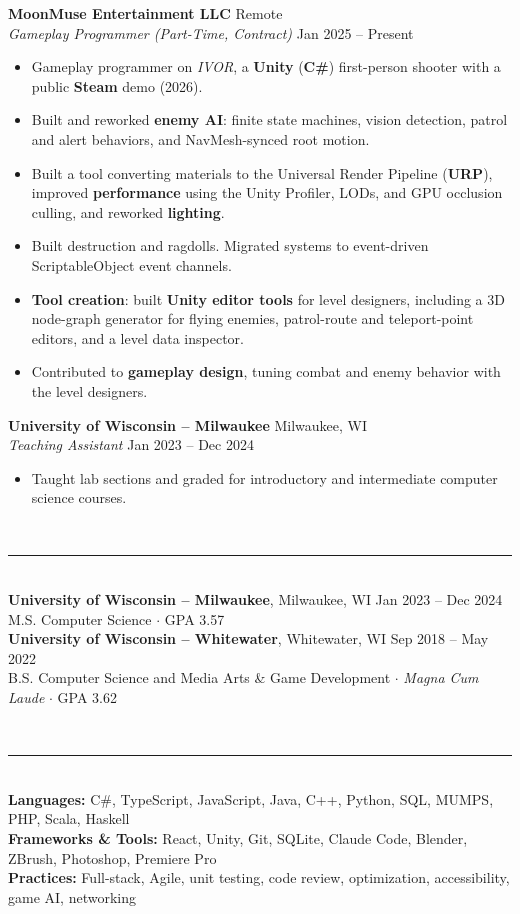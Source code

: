 \documentclass[letterpaper, 11pt]{article}
\newcommand{\header}[1]{%
  \vspace{5pt}{\large\scshape #1}\\[-7pt]\rule{\linewidth}{0.4pt}\\[1pt]}
\newcommand{\role}[4]{%
  \textbf{#1} \hfill #2\\ \textit{#3} \hfill #4\\[-1pt]}
\begin{document}
\role{MoonMuse Entertainment LLC}{Remote}{Gameplay Programmer (Part-Time, Contract)}{Jan 2025 -- Present}
\begin{itemize}
  \item Gameplay programmer on \textit{IVOR}, a \textbf{Unity} (\textbf{C\#}) first-person shooter with a public \textbf{Steam} demo (2026).
  \item Built and reworked \textbf{enemy AI}: finite state machines, vision detection, patrol and alert behaviors, and NavMesh-synced root motion.
  \item Built a tool converting materials to the Universal Render Pipeline (\textbf{URP}), improved \textbf{performance} using the Unity Profiler, LODs, and GPU occlusion culling, and reworked \textbf{lighting}.
  \item Built destruction and ragdolls.  Migrated systems to event-driven ScriptableObject event channels.
  \item \textbf{Tool creation}: built \textbf{Unity editor tools} for level designers, including a 3D node-graph generator for flying enemies, patrol-route and teleport-point editors, and a level data inspector.
  \item Contributed to \textbf{gameplay design}, tuning combat and enemy behavior with the level designers.
\end{itemize}
\vspace{4pt}

\role{University of Wisconsin -- Milwaukee}{Milwaukee, WI}{Teaching Assistant}{Jan 2023 -- Dec 2024}
\begin{itemize}
  \item Taught lab sections and graded for introductory and intermediate computer science courses.
\end{itemize}

\header{Education}
\textbf{University of Wisconsin -- Milwaukee}, Milwaukee, WI \hfill Jan 2023 -- Dec 2024\\
M.S. Computer Science $\cdot$ GPA 3.57\\[3pt]
\textbf{University of Wisconsin -- Whitewater}, Whitewater, WI \hfill Sep 2018 -- May 2022\\
B.S. Computer Science and Media Arts \& Game Development $\cdot$ \textit{Magna Cum Laude} $\cdot$ GPA 3.62

\header{Skills}
\textbf{Languages:} C\#, TypeScript, JavaScript, Java, C++, Python, SQL, MUMPS, PHP, Scala, Haskell\\
\textbf{Frameworks \& Tools:} React, Unity, Git, SQLite, Claude Code, Blender, ZBrush, Photoshop, Premiere Pro\\
\textbf{Practices:} Full-stack, Agile, unit testing, code review, optimization, accessibility, game AI, networking
\end{document}
